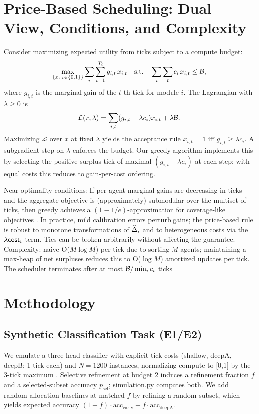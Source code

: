 \section{Price-Based Scheduling: Dual View, Conditions, and Complexity}
\label{sec:dual}
Consider maximizing expected utility from ticks subject to a compute budget:
\[
\max_{\{x_{i,t}\in\{0,1\}\}} \sum_{i} \sum_{t=1}^{T_i} g_{i,t} \, x_{i,t}
\quad\text{s.t.}\quad \sum_{i} \sum_{t} c_i \, x_{i,t} \le \mathcal{B},
\]
where $g_{i,t}$ is the marginal gain of the $t$-th tick for module $i$. The Lagrangian with $\lambda\ge 0$ is
\[
\mathcal{L}(x,\lambda) = \sum_{i,t} (g_{i,t}-\lambda c_i) x_{i,t} + \lambda \mathcal{B}.
\]
Maximizing $\mathcal{L}$ over $x$ at fixed $\lambda$ yields the acceptance rule $x_{i,t}=1$ iff $g_{i,t} \ge \lambda c_i$. A subgradient step on $\lambda$ enforces the budget. Our greedy algorithm implements this by selecting the positive-surplus tick of maximal $(g_{i,t}-\lambda c_i)$ at each step; with equal costs this reduces to gain-per-cost ordering.

Near-optimality conditions: If per-agent marginal gains are decreasing in ticks and the aggregate objective is (approximately) submodular over the multiset of ticks, then greedy achieves a $(1-1/e)$-approximation for coverage-like objectives \cite{Nemhauser1978}. In practice, mild calibration errors perturb gains; the price-based rule is robust to monotone transformations of $\widehat{\Delta}_i$ and to heterogeneous costs via the $\lambda \mathsf{cost}_i$ term. Ties can be broken arbitrarily without affecting the guarantee. Complexity: naive O($M\log M$) per tick due to sorting $M$ agents; maintaining a max-heap of net surpluses reduces this to O($\log M$) amortized updates per tick. The scheduler terminates after at most $\mathcal{B}/\min_i c_i$ ticks.

\section{Methodology}
\label{sec:method}
\subsection{Synthetic Classification Task (E1/E2)}
We emulate a three-head classifier with explicit tick costs (shallow, deepA, deepB; 1 tick each) and $N{=}1200$ instances, normalizing compute to [0,1] by the 3-tick maximum \cite{Huang2018MSDNet,Wang2018SkipNet}. Selective refinement at budget 2 induces a refinement fraction $f$ and a selected-subset accuracy $p_{\mathrm{sel}}$; simulation.py computes both. We add random-allocation baselines at matched $f$ by refining a random subset, which yields expected accuracy $(1-f)\cdot \mathrm{acc}_{\text{early}} + f \cdot \mathrm{acc}_{\text{deepA}}$.

